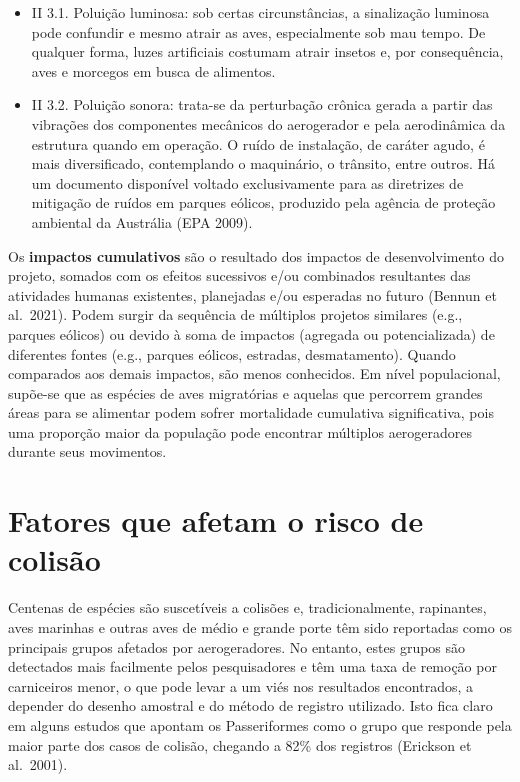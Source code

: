 \documentclass[
  oneside]{scrbook}
\begin{document}
\begin{itemize}
\item
  II 3.1. Poluição luminosa: sob certas circunstâncias, a sinalização luminosa pode confundir e mesmo atrair as aves, especialmente sob mau tempo. De qualquer forma, luzes artificiais costumam atrair insetos e, por consequência, aves e morcegos em busca de alimentos.
\item
  II 3.2. Poluição sonora: trata-se da perturbação crônica gerada a partir das vibrações dos componentes mecânicos do aerogerador e pela aerodinâmica da estrutura quando em operação. O ruído de instalação, de caráter agudo, é mais diversificado, contemplando o maquinário, o trânsito, entre outros. Há um documento disponível voltado exclusivamente para as diretrizes de mitigação de ruídos em parques eólicos, produzido pela agência de proteção ambiental da Austrália (EPA 2009).
\end{itemize}

Os \textbf{impactos cumulativos} são o resultado dos impactos de desenvolvimento do projeto, somados com os efeitos sucessivos e/ou combinados resultantes das atividades humanas existentes, planejadas e/ou esperadas no futuro (Bennun et al.~2021). Podem surgir da sequência de múltiplos projetos similares (e.g., parques eólicos) ou devido à soma de impactos (agregada ou potencializada) de diferentes fontes (e.g., parques eólicos, estradas, desmatamento). Quando comparados aos demais impactos, são menos conhecidos. Em nível populacional, supõe-se que as espécies de aves migratórias e aquelas que percorrem grandes áreas para se alimentar podem sofrer mortalidade cumulativa significativa, pois uma proporção maior da população pode encontrar múltiplos aerogeradores durante seus movimentos.

\hypertarget{fatores-que-afetam-o-risco-de-colisuxe3o}{%
\section{Fatores que afetam o risco de colisão}\label{fatores-que-afetam-o-risco-de-colisuxe3o}}

Centenas de espécies são suscetíveis a colisões e, tradicionalmente, rapinantes, aves marinhas e outras aves de médio e grande porte têm sido reportadas como os principais grupos afetados por aerogeradores. No entanto, estes grupos são detectados mais facilmente pelos pesquisadores e têm uma taxa de remoção por carniceiros menor, o que pode levar a um viés nos resultados encontrados, a depender do desenho amostral e do método de registro utilizado. Isto fica claro em alguns estudos que apontam os Passeriformes como o grupo que responde pela maior parte dos casos de colisão, chegando a 82\% dos registros (Erickson et al.~2001).
\end{document}
